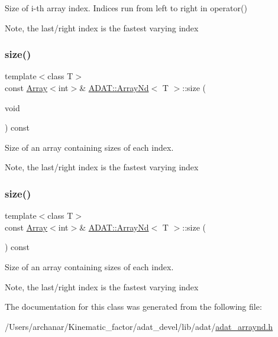 Size of i-\/th array index. Indices run from left to right in operator() 

Note, the last/right index is the fastest varying index \mbox{\label{classADAT_1_1ArrayNd_a81494e519c7c5fae6e7ef2e2b46ba24b}} 
\subsubsection{\texorpdfstring{size()}{size()}\hspace{0.1cm}{\footnotesize\ttfamily [3/4]}}
{\footnotesize\ttfamily template$<$class T$>$ \\
const \mbox{\hyperlink{classXMLArray_1_1Array}{Array}}$<$int$>$\& \mbox{\hyperlink{classADAT_1_1ArrayNd}{A\+D\+A\+T\+::\+Array\+Nd}}$<$ T $>$\+::size (\begin{DoxyParamCaption}\item[{void}]{ }\end{DoxyParamCaption}) const\hspace{0.3cm}{\ttfamily [inline]}}



Size of an array containing sizes of each index. 

Note, the last/right index is the fastest varying index \mbox{\label{classADAT_1_1ArrayNd_a81494e519c7c5fae6e7ef2e2b46ba24b}} 
\subsubsection{\texorpdfstring{size()}{size()}\hspace{0.1cm}{\footnotesize\ttfamily [4/4]}}
{\footnotesize\ttfamily template$<$class T$>$ \\
const \mbox{\hyperlink{classXMLArray_1_1Array}{Array}}$<$int$>$\& \mbox{\hyperlink{classADAT_1_1ArrayNd}{A\+D\+A\+T\+::\+Array\+Nd}}$<$ T $>$\+::size (\begin{DoxyParamCaption}{ }\end{DoxyParamCaption}) const\hspace{0.3cm}{\ttfamily [inline]}}



Size of an array containing sizes of each index. 

Note, the last/right index is the fastest varying index 

The documentation for this class was generated from the following file\+:\begin{DoxyCompactItemize}
\item 
/\+Users/archanar/\+Kinematic\+\_\+factor/adat\+\_\+devel/lib/adat/\mbox{\hyperlink{lib_2adat_2adat__arraynd_8h}{adat\+\_\+arraynd.\+h}}\end{DoxyCompactItemize}
